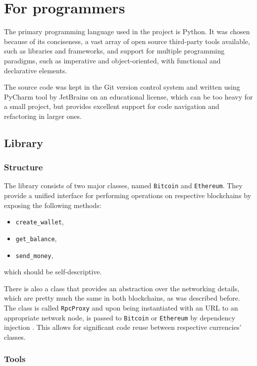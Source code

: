 \chapter{For programmers}

The primary programming language used in the project is Python.
It was chosen because of its conciseness,
a vast array of open source third-party tools available,
such as libraries and frameworks,
and support for multiple programming paradigms,
such as imperative and object-oriented,
with functional and declarative elements.

The source code was kept in the Git \cite{git} version control system
and written using PyCharm \cite{pycharm} tool by JetBrains
on an educational license,
which can be too heavy for a small project,
but provides excellent support for code navigation and refactoring
in larger ones.

\section{Library}

\subsection{Structure}

The library consists of two major classes,
named \texttt{Bitcoin} and \texttt{Ethereum}.
They provide a unified interface for performing operations
on respective blockchains by exposing the following methods:
\begin{itemize}
    \item \texttt{create\_wallet},
    \item \texttt{get\_balance},
    \item \texttt{send\_money},
\end{itemize}
which should be self-descriptive.

There is also a class that provides an abstraction over the networking details,
which are pretty much the same in both blockchains,
as was described before.
The class is called \texttt{RpcProxy} and upon being instantiated with an URL
to an appropriate network node,
is passed to \texttt{Bitcoin} or \texttt{Ethereum} by dependency injection \cite{di}.
This allows for significant code reuse between respective currencies' classes.

\subsection{Tools} \label{6:lib:tools}

